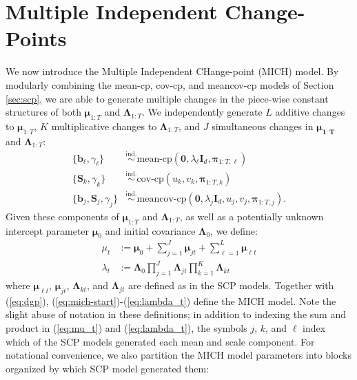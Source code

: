 \section{Multiple Independent Change-Points}
\label{sec:mich}

We now introduce the Multiple Independent CHange-point (MICH) model. By modularly combining the mean-cp, cov-cp, and meancov-cp models of Section \ref{sec:scp}, we are able to generate multiple changes in the piece-wise constant structures of both $\boldsymbol{\mu}_{1:T}$ and $\boldsymbol{\Lambda}_{1:T}$. We independently generate $L$ additive changes to $\boldsymbol{\mu}_{1:T}$, $K$ multiplicative changes to $\boldsymbol{\Lambda}_{1:T}$, and $J$ simultaneous changes in $\boldsymbol{\mu_{1:T}}$ and $\boldsymbol{\Lambda}_{1:T}$: 
\begin{align}
    \label{eq:mich-start}
    \{\mathbf{b}_\ell, \gamma_\ell\} &\overset{\text{ind.}}{\sim} \text{mean-cp}(\mathbf{0}, \lambda_\ell\mathbf{I}_d, \boldsymbol{\pi}_{1:T,\ell}) \\
    \{\mathbf{S}_k, \gamma_k\} &\overset{\text{ind.}}{\sim} \text{cov-cp}(u_k, v_k, \boldsymbol{\pi}_{1:T,k}) \\
    \{\mathbf{b}_j, \mathbf{S}_j, \gamma_j\} &\overset{\text{ind.}}{\sim} \text{meancov-cp}(\mathbf{0}, \lambda_j\mathbf{I}_d, u_j, v_j, \boldsymbol{\pi}_{1:T,j}).\label{eq:mich-var-end}
\end{align}
Given these components of $\boldsymbol{\mu}_{1:T}$ and $\boldsymbol{\Lambda}_{1:T}$, as well as a potentially unknown intercept parameter $\boldsymbol{\mu}_0$ and initial covariance $\boldsymbol{\Lambda}_0$, we define:
\begin{align}
    \mu_{t} &:= \boldsymbol{\mu}_0 + \sum_{j = 1}^J \boldsymbol{\mu}_{jt}  + \sum_{\ell = 1}^L \boldsymbol{\mu}_{\ell t} \label{eq:mu_t}\\
    \lambda_t &:= \boldsymbol{\Lambda}_0\prod_{j=1}^J \boldsymbol{\Lambda}_{jt}\prod_{k=1}^K \boldsymbol{\Lambda}_{kt} \label{eq:lambda_t}
\end{align}
where $\boldsymbol{\mu}_{\ell t}$, $\boldsymbol{\mu}_{jt}$, $\boldsymbol{\Lambda}_{kt}$, and $\boldsymbol{\Lambda}_{jt}$ are defined as in the SCP models. Together with (\ref{eq:dgp}), (\ref{eq:mich-start})-(\ref{eq:lambda_t}) define the MICH model. Note the slight abuse of notation in these definitions; in addition to indexing the sum and product in (\ref{eq:mu_t}) and (\ref{eq:lambda_t}), the symbols $j$, $k$, and $\ell$ index which of the SCP models generated each mean and scale component. For notational convenience, we also partition the MICH model parameters into blocks organized by which SCP model generated them: 
